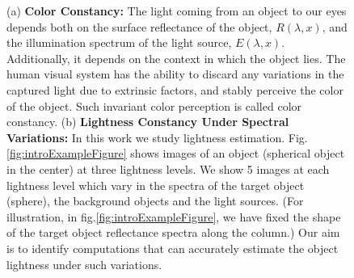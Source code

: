 \documentclass{jov}
\begin{document}
\begin{figure}
    \caption{(a) {\bf Color Constancy:} The light coming from an object to our eyes depends both on the surface reflectance of the object, $R(\lambda,x)$, and the illumination spectrum of the light source, $E(\lambda,x)$. Additionally, it depends on the context in which the object lies. The human visual system has the ability to discard any variations in the captured light due to extrinsic factors, and stably perceive the color of the object. Such invariant color perception is called color constancy. (b) {\bf Lightness Constancy Under Spectral Variations:} In this work we study lightness estimation. Fig.\ref{fig:introExampleFigure} shows images of an object (spherical object in the center) at three lightness levels. We show 5 images at each lightness level which vary in the spectra of the target object (sphere), the background objects and the light sources. (For illustration, in fig.\ref{fig:introExampleFigure}, we have fixed the shape of the target object reflectance spectra along the column.) Our aim is to identify computations that can accurately estimate the object lightness under such variations.} 
\end{figure}

\end{document}
